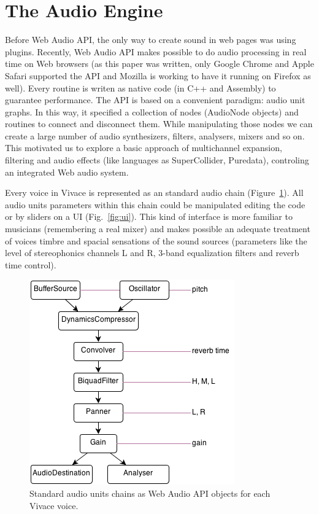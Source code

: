 \documentclass[letterpaper, 12pt]{article}
\begin{document}
\section{The Audio Engine}
\label{audioengine}

Before Web Audio API, the only way to create sound in web pages was
using plugins. Recently, Web Audio API makes possible to do audio
processing in real time on Web browsers (as this paper was written,
only Google Chrome and Apple Safari supported the API and Mozilla is
working to have it running on Firefox as well). Every routine is
writen as native code (in C++ and Assembly) to guarantee
performance. The API is based on a convenient paradigm: audio unit
graphs. In this way, it specified a collection of nodes (AudioNode
objects) and routines to connect and disconnect them. While
manipulating those nodes we can create a large number of audio
synthesizers, filters, analysers, mixers and so on. This motivated us
to explore a basic approach of multichannel expansion, filtering and
audio effects (like languages as SuperCollider, Puredata), controling
an integrated Web audio system.

Every voice in Vivace is represented as an standard audio chain
(Figure~\ref{fig:chain}). All audio units parameters within this chain
could be manipulated editing the code or by sliders on a UI
(Fig.~\ref{fig:ui}). This kind of interface is more familiar to
musicians (remembering a real mixer) and makes possible an adequate
treatment of voices timbre and spacial sensations of the sound sources
(parameters like the level of stereophonics channels L and R, 3-band
equalization filters and reverb time control).

\begin{figure}[htpb]
  \begin{center}
    \includegraphics[scale=.5]{img/fig_chain.png}
    \caption{Standard audio units chains as Web Audio API objects for
      each Vivace voice.}
    \label{fig:chain}
  \end{center}
\end{figure}
\end{document}
